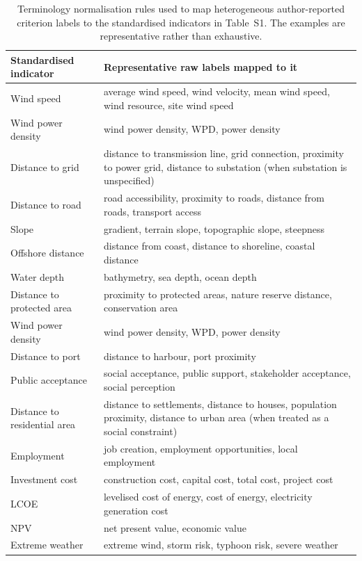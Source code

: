 \documentclass[12pt,a4paper]{article}
\begin{document}
\newpage
\begin{table}[htbp]
\centering
\small
\caption{Terminology normalisation rules used to map heterogeneous author-reported criterion labels to the standardised indicators in Table~S1. The examples are representative rather than exhaustive.}
\label{tab:mapping}
\begin{tabular}{p{4.2cm}p{8.5cm}}
\toprule
\textbf{Standardised indicator} & \textbf{Representative raw labels mapped to it} \\
\midrule
Wind speed & average wind speed, wind velocity, mean wind speed, wind resource, site wind speed \\
Wind power density & wind power density, WPD, power density \\
Distance to grid & distance to transmission line, grid connection, proximity to power grid, distance to substation (when substation is unspecified) \\
Distance to road & road accessibility, proximity to roads, distance from roads, transport access \\
Slope & gradient, terrain slope, topographic slope, steepness \\
Offshore distance & distance from coast, distance to shoreline, coastal distance \\
Water depth & bathymetry, sea depth, ocean depth \\
Distance to protected area & proximity to protected areas, nature reserve distance, conservation area \\
Wind power density & wind power density, WPD, power density \\
Distance to port & distance to harbour, port proximity \\
Public acceptance & social acceptance, public support, stakeholder acceptance, social perception \\
Distance to residential area & distance to settlements, distance to houses, population proximity, distance to urban area (when treated as a social constraint) \\
Employment & job creation, employment opportunities, local employment \\
Investment cost & construction cost, capital cost, total cost, project cost \\
LCOE & levelised cost of energy, cost of energy, electricity generation cost \\
NPV & net present value, economic value \\
Extreme weather & extreme wind, storm risk, typhoon risk, severe weather \\

\end{tabular}
\end{table}
\end{document}
